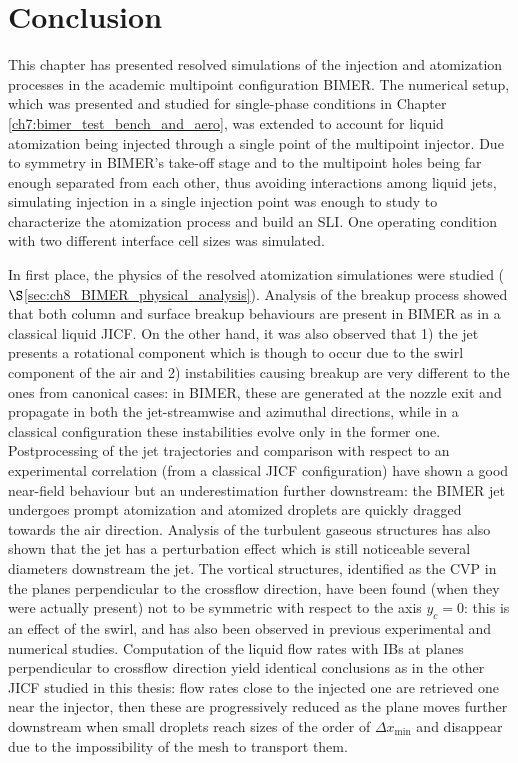 \section{Conclusion}

This chapter has presented resolved simulations of the injection and atomization processes in the academic multipoint configuration BIMER. The numerical setup, which was presented and studied for single-phase conditions in Chapter \ref{ch7:bimer_test_bench_and_aero}, was extended to account for liquid atomization being injected through a single point of the multipoint injector. Due to symmetry in BIMER's take-off stage and to the multipoint holes being far enough separated from each other, thus avoiding interactions among liquid jets, simulating injection in a single injection point was enough to study to characterize the atomization process and build an SLI. One operating condition with two different interface cell sizes was simulated. 

In first place, the physics of the resolved atomization simulationes were studied ($\S$\ref{sec:ch8_BIMER_physical_analysis}). Analysis of the breakup process showed that both column and surface breakup behaviours are present in BIMER as in a classical liquid JICF. On the other hand, it was also observed that 1) the jet presents a rotational component which is though to occur due to the swirl component of the air and 2) instabilities causing breakup are very different to the ones from canonical cases: in BIMER, these are generated at the nozzle exit and propagate in both the jet-streamwise and azimuthal directions, while in a classical configuration these instabilities evolve only in the former one. Postprocessing of the jet trajectories and comparison with respect to an experimental correlation (from a classical JICF configuration) have shown a good near-field behaviour but an underestimation further downstream: the BIMER jet undergoes prompt atomization and atomized droplets are quickly dragged towards the air direction. Analysis of the turbulent gaseous structures has also shown that the jet has a perturbation effect which is still noticeable several diameters downstream the jet. The vortical structures, identified as the CVP in the planes perpendicular to the crossflow direction, have been found (when they were actually present) not to be symmetric with respect to the axis $y_c = 0$: this is an effect of the swirl, and has also been observed in previous experimental and numerical studies. Computation of the liquid flow rates with IBs at planes perpendicular to crossflow direction yield identical conclusions as in the other JICF studied in this thesis: flow rates close to the injected one are retrieved one near the injector, then these are progressively reduced as the plane moves further downstream when small droplets reach sizes of the order of  $\Delta x_\mathrm{min}$ and disappear due to the impossibility of the mesh to transport them.



